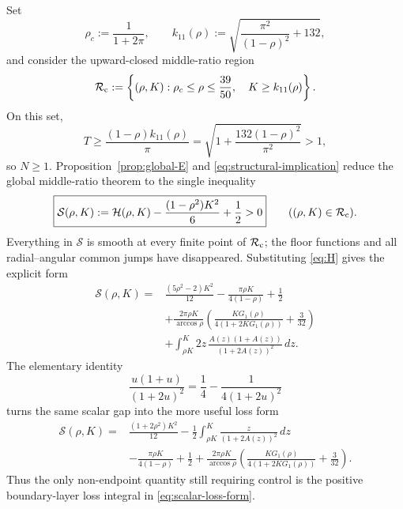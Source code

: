 \documentclass[11pt]{article}
\theoremstyle{remark}
\begin{document}
Set
\begin{equation}
 \rho_c:=\frac1{1+2\pi},
 \qquad
 k_{11}(\rho):=
 \sqrt{\frac{\pi^2}{(1-\rho)^2}+132},
 \label{eq:compact-constants}
\end{equation}
and consider the upward-closed middle-ratio region
\begin{equation}
 \mathcal R_{\rm c}:=
 \left\{(\rho,K):
 \rho_c\leq\rho\leq\frac{39}{50},\quad
 K\geq k_{11}(\rho)\right\}.
 \label{eq:compact-region}
\end{equation}
On this set,
\begin{equation}
 T\geq\frac{(1-\rho)k_{11}(\rho)}\pi
 =\sqrt{1+\frac{132(1-\rho)^2}{\pi^2}}>1,
 \label{eq:N-positive}
\end{equation}
so $N\geq1$.  Proposition~\ref{prop:global-E} and
\eqref{eq:structural-implication} reduce the global middle-ratio theorem to
the single inequality
\begin{equation}
 \boxed{
 \mathcal S(\rho,K):=
 \mathcal H(\rho,K)
 -\frac{(1-\rho^2)K^2}{6}
 +\frac12>0
 }
 \qquad ((\rho,K)\in\mathcal R_{\rm c}).
 \label{eq:scalar-gap}
\end{equation}
Everything in $\mathcal S$ is smooth at every finite point of
$\mathcal R_{\rm c}$; the floor functions and all radial--angular common
jumps have disappeared.  Substituting \eqref{eq:H} gives the explicit form
\begin{equation}
 \begin{aligned}
 \mathcal S(\rho,K)={}&
 \frac{(5\rho^2-2)K^2}{12}
 -\frac{\pi\rho K}{4(1-\rho)}+\frac12\\
 &+\frac{2\pi\rho K}{\arccos\rho}
   \left(\frac{KG_1(\rho)}{4(1+2KG_1(\rho))}
         +\frac3{32}\right)\\
 &+\int_{\rho K}^{K}
 2z\,\frac{A(z)(1+A(z))}{(1+2A(z))^2}\,dz.
 \end{aligned}
 \label{eq:scalar-expanded}
\end{equation}
The elementary identity
\begin{equation}
 \frac{u(1+u)}{(1+2u)^2}
 =\frac14-\frac{1}{4(1+2u)^2}
 \label{eq:kernel-loss}
\end{equation}
turns the same scalar gap into the more useful loss form
\begin{equation}
 \begin{aligned}
 \mathcal S(\rho,K)={}&
 \frac{(1+2\rho^2)K^2}{12}
 -\frac12\int_{\rho K}^{K}
       \frac{z}{(1+2A(z))^2}\,dz\\
 &-\frac{\pi\rho K}{4(1-\rho)}+\frac12
 +\frac{2\pi\rho K}{\arccos\rho}
   \left(\frac{KG_1(\rho)}{4(1+2KG_1(\rho))}
         +\frac3{32}\right).
 \end{aligned}
 \label{eq:scalar-loss-form}
\end{equation}
Thus the only non-endpoint quantity still requiring control is the
positive boundary-layer loss integral in
\eqref{eq:scalar-loss-form}.
\end{document}
